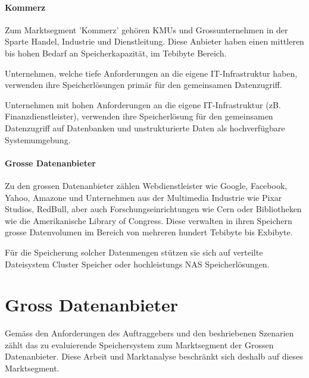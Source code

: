 \paragraph*{Kommerz}
Zum Marktsegment 'Kommerz' gehören KMUs und Grossunternehmen in der Sparte Handel, Industrie und Dienstleitung. Diese Anbieter haben einen mittleren bis hohen Bedarf an Speicherkapazität, im Tebibyte Bereich. 

Unternehmen, welche tiefe Anforderungen an die eigene IT-Infrastruktur haben, verwenden ihre Speicherlösungen primär für den gemeinsamen Datenzugriff. 


Unternehmen mit hohen Anforderungen an die eigene IT-Infrastruktur (zB. Finanzdienstleister), verwenden ihre Speicherlösung für den gemeinsamen Datenzugriff auf Datenbanken und unstrukturierte Daten als hochverfügbare Systemumgebung.


\paragraph*{Grosse Datenanbieter}
Zu den grossen Datenanbieter zählen Webdienstleister wie Google, Facebook, Yahoo, Amazone und Unternehmen aus der Multimedia Industrie wie Pixar Studios, RedBull, aber auch Forschungseinrichtungen wie Cern oder Bibliotheken wie die Amerikanische Library of Congress.
Diese verwalten in ihren Speichern grosse Datenvolumen im Bereich von mehreren hundert Tebibyte bis Exbibyte. 

Für die Speicherung solcher Datenmengen stützen sie sich auf verteilte Dateisystem Cluster Speicher oder hochleistungs NAS Speicherlösungen. 

\section{Gross Datenanbieter}
Gemäss den Anforderungen des Auftraggebers und den beshriebenen Szenarien zählt das zu evaluierende Speichersystem zum Marktsegment der Grossen Datenanbieter. Diese Arbeit und Marktanalyse beschränkt sich deshalb auf dieses Marktsegment.

